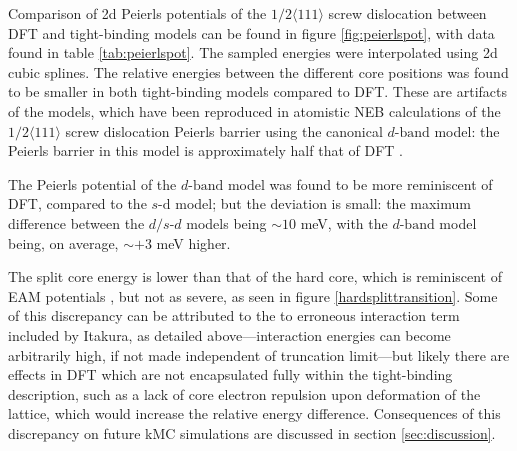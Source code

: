 \documentclass[a4paper,11pt]{article}
\begin{document}
Comparison of 2d Peierls potentials of the \(1/2\langle 111 \rangle\)
screw dislocation between DFT and tight-binding models can be found in
figure \ref{fig:peierlspot}, with data found in table
\ref{tab:peierlspot}. The sampled energies were interpolated using 2d
cubic splines. The relative energies between the different core
positions was found to be smaller in both tight-binding models compared
to DFT. These are artifacts of the models, which have been reproduced in
atomistic NEB calculations of the \(1/2\langle 111\rangle\) screw
dislocation Peierls barrier using the canonical \(d\text{-band}\) model:
the Peierls barrier in this model is approximately half
that of DFT \cite{Simpson2019}.

The Peierls potential of the \(d\text{-band}\) model was found to be more
reminiscent of DFT, compared to the \(s\text{-d}\) model; but the
deviation is small: the maximum difference between the \(d\text{/}s\text{-}d\)
models being \(\sim 10\) meV, with the \(d\text{-band}\) model being, on average,
\(\sim+3\) meV higher.

The split core energy is lower than that of the hard
core, which is reminiscent of EAM potentials \cite{Itakura2012}, but not
as severe, as seen in figure \ref{hardsplittransition}. Some of
this discrepancy can be attributed to the to erroneous interaction term
included by Itakura, as detailed above---interaction energies can become
arbitrarily high, if not made independent of truncation limit---but
likely there are effects in DFT which are not encapsulated fully within
the tight-binding description, such as a lack of core electron repulsion
upon deformation of the lattice, which would increase the relative
energy difference. Consequences of this discrepancy on future kMC
simulations are discussed in section \ref{sec:discussion}.
\end{document}
